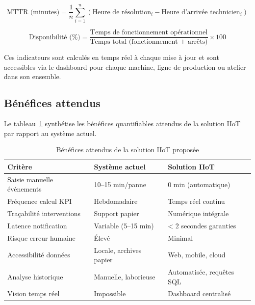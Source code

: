 \begin{equation}
\text{MTTR (minutes)} = \frac{1}{n}\sum_{i=1}^{n} (\text{Heure de résolution}_i - \text{Heure d'arrivée technicien}_i)
\label{eq:mttr}
\end{equation}

\begin{equation}
\text{Disponibilité (\%)} = \frac{\text{Temps de fonctionnement opérationnel}}{\text{Temps total (fonctionnement + arrêts)}} \times 100
\label{eq:disponibilite}
\end{equation}

Ces indicateurs sont calculés en temps réel à chaque mise à jour et sont accessibles via le dashboard pour chaque machine, ligne de production ou atelier dans son ensemble.

\subsection{Bénéfices attendus}

Le tableau~\ref{tab:benefices_solution} synthétise les bénéfices quantifiables attendus de la solution IIoT par rapport au système actuel.

\begin{table}[htbp]
\centering
\caption{Bénéfices attendus de la solution IIoT proposée}
\label{tab:benefices_solution}
\small
\begin{tabular}{@{}p{4.5cm}p{3.5cm}p{4.5cm}@{}}
\toprule
\textbf{Critère} & \textbf{Système actuel} & \textbf{Solution IIoT} \\
\midrule
\rowcolor{gray!10}
Saisie manuelle événements & 10--15 min/panne & 0 min (automatique) \\
Fréquence calcul KPI & Hebdomadaire & Temps réel continu \\
\rowcolor{gray!10}
Traçabilité interventions & Support papier & Numérique intégrale \\
Latence notification & Variable (5--15 min) & < 2 secondes garanties \\
\rowcolor{gray!10}
Risque erreur humaine & Élevé & Minimal \\
Accessibilité données & Locale, archives papier & Web, mobile, cloud \\
\rowcolor{gray!10}
Analyse historique & Manuelle, laborieuse & Automatisée, requêtes SQL \\
Vision temps réel & Impossible & Dashboard centralisé \\
\bottomrule
\end{tabular}
\end{table}

